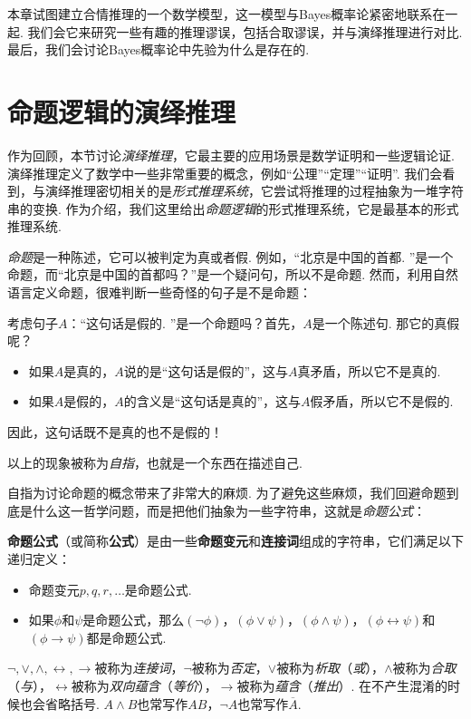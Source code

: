 本章试图建立合情推理的一个数学模型，这一模型与Bayes概率论紧密地联系在一起. 我们会它来研究一些有趣的推理谬误，包括合取谬误，并与演绎推理进行对比. 最后，我们会讨论Bayes概率论中先验为什么是存在的.

\section{命题逻辑的演绎推理}

作为回顾，本节讨论\textit{演绎推理}，它最主要的应用场景是数学证明和一些逻辑论证. 演绎推理定义了数学中一些非常重要的概念，例如“公理”“定理”“证明”. 我们会看到，与演绎推理密切相关的是\textit{形式推理系统}，它尝试将推理的过程抽象为一堆字符串的变换. 作为介绍，我们这里给出\textit{命题逻辑}的形式推理系统，它是最基本的形式推理系统. 

\textit{命题}是一种陈述，它可以被判定为真或者假. 例如，“北京是中国的首都. ”是一个命题，而“北京是中国的首都吗？”是一个疑问句，所以不是命题. 然而，利用自然语言定义命题，很难判断一些奇怪的句子是不是命题：

\begin{example}
考虑句子$A$：“这句话是假的. ”是一个命题吗？首先，$A$是一个陈述句. 那它的真假呢？
\begin{itemize}
    \item 如果$A$是真的，$A$说的是“这句话是假的”，这与$A$真矛盾，所以它不是真的. 
    \item 如果$A$是假的，$A$的含义是“这句话是真的”，这与$A$假矛盾，所以它不是假的. 
\end{itemize}
因此，这句话既不是真的也不是假的！
\end{example}

以上的现象被称为\textit{自指}，也就是一个东西在描述自己.

自指为讨论命题的概念带来了非常大的麻烦. 为了避免这些麻烦，我们回避命题到底是什么这一哲学问题，而是把他们抽象为一些字符串，这就是\textit{命题公式}：

\begin{definition}[命题公式]
\textbf{命题公式}（或简称\textbf{公式}）是由一些\textbf{命题变元}和\textbf{连接词}组成的字符串，它们满足以下递归定义：
\begin{itemize}
    \item 命题变元$p,q,r,\dots$是命题公式. 
    \item 如果$\phi$和$\psi$是命题公式，那么$(\neg\phi)$，$(\phi\vee\psi)$，$(\phi\wedge\psi)$，$(\phi\leftrightarrow\psi)$和$(\phi\to\psi)$都是命题公式. 
\end{itemize}

$\neg,\vee,\wedge,\leftrightarrow,\to$被称为\textit{连接词}，$\neg$被称为\textit{否定}，$\vee$被称为\textit{析取}（\textit{或}），$\wedge$被称为\textit{合取}（\textit{与}），$\leftrightarrow$被称为\textit{双向蕴含}（\textit{等价}），$\to$被称为\textit{蕴含}（\textit{推出}）. 在不产生混淆的时候也会省略括号. $A\wedge B$也常写作$AB$，$\neg A$也常写作$\overline{A}$.
\end{definition}

